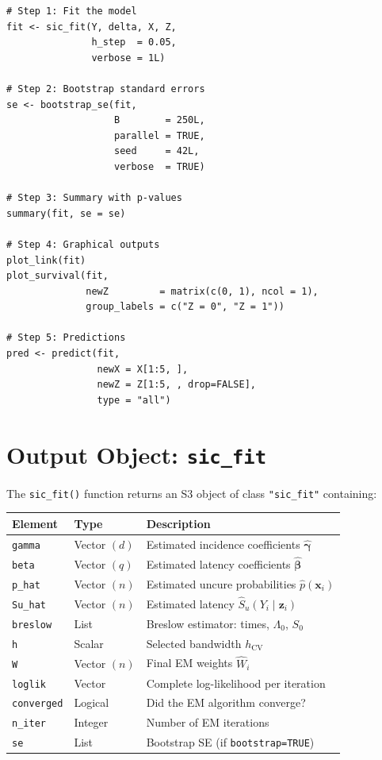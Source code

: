 \documentclass[12pt,a4paper]{article}
\begin{document}
\begin{lstlisting}[style=Rcode,
  caption={Step-by-step workflow}]
# Step 1: Fit the model
fit <- sic_fit(Y, delta, X, Z,
               h_step  = 0.05,
               verbose = 1L)

# Step 2: Bootstrap standard errors
se <- bootstrap_se(fit,
                   B        = 250L,
                   parallel = TRUE,
                   seed     = 42L,
                   verbose  = TRUE)

# Step 3: Summary with p-values
summary(fit, se = se)

# Step 4: Graphical outputs
plot_link(fit)
plot_survival(fit,
              newZ         = matrix(c(0, 1), ncol = 1),
              group_labels = c("Z = 0", "Z = 1"))

# Step 5: Predictions
pred <- predict(fit,
                newX = X[1:5, ],
                newZ = Z[1:5, , drop=FALSE],
                type = "all")
\end{lstlisting}

\section{Output Object: \texttt{sic\_fit}}

The \texttt{sic\_fit()} function returns an S3 object of class
\texttt{"sic\_fit"} containing:

\begin{center}
\begin{tabular}{lll}
  \toprule
  \textbf{Element} & \textbf{Type} & \textbf{Description} \\
  \midrule
  \texttt{gamma}     & Vector $(d)$ &
    Estimated incidence coefficients $\hat{\boldsymbol{\gamma}}$ \\
  \texttt{beta}      & Vector $(q)$ &
    Estimated latency coefficients $\hat{\boldsymbol{\beta}}$ \\
  \texttt{p\_hat}    & Vector $(n)$ &
    Estimated uncure probabilities $\hat{p}(\mathbf{x}_i)$ \\
  \texttt{Su\_hat}   & Vector $(n)$ &
    Estimated latency $\hat{S}_u(Y_i \mid \mathbf{z}_i)$ \\
  \texttt{breslow}   & List &
    Breslow estimator: times, $\Lambda_0$, $S_0$ \\
  \texttt{h}         & Scalar &
    Selected bandwidth $h_{\mathrm{CV}}$ \\
  \texttt{W}         & Vector $(n)$ &
    Final EM weights $\hat{W}_i$ \\
  \texttt{loglik}    & Vector &
    Complete log-likelihood per iteration \\
  \texttt{converged} & Logical &
    Did the EM algorithm converge? \\
  \texttt{n\_iter}   & Integer &
    Number of EM iterations \\
  \texttt{se}        & List &
    Bootstrap SE (if \texttt{bootstrap=TRUE}) \\
  \bottomrule
\end{tabular}
\end{center}
\end{document}
